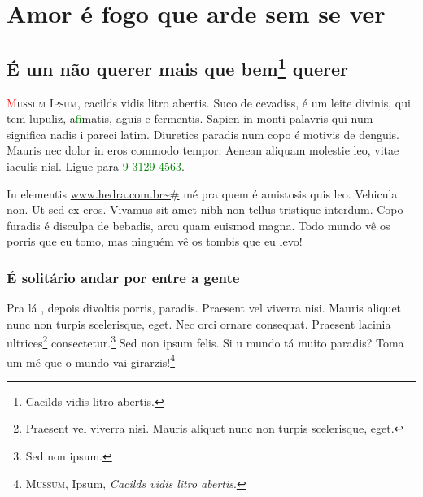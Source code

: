 
\part{Amor é fogo que arde sem se ver}

\begin{argumento}
  \lipsum[1]
\end{argumento}

\chapter{É um não querer mais que bem\footnote{Cacilds vidis litro abertis.} querer}


\begin{didascalia}
  \lipsum[2]
\end{didascalia}

\newcommand{\pacote}[1]{\marginnote{\tiny\alltt{#1}}}


\pacote{edlab-extra}
\begin{epigraphs} 
\end{epigraphs}

\pacote{lettrine.sty}
\lettrine[realheight]{\textcolor{red}{M}}{ussum Ipsum}, cacilds vidis litro abertis. Suco de cevadiss, é um leite
divinis, qui tem lupuliz, a\textcolor{green}{fi}matis, aguis e fermentis. Sapien in monti palavris
qui num significa nadis i pareci latim.  Diuretics paradis num copo é motivis
de denguis. Mauris nec dolor in eros commodo tempor. Aenean aliquam molestie
leo, vitae iaculis nisl. Ligue para \textcolor{green}{9-3129-4563}.


In elementis \url{www.hedra.com.br\~#} mé pra quem é amistosis quis leo. Vehicula non. Ut sed ex eros.
Vivamus sit amet nibh non tellus tristique interdum. Copo furadis é disculpa de
bebadis, arcu quam euismod magna. Todo mundo vê os porris que eu tomo, mas
ninguém vê os tombis que eu levo!

\section{É solitário andar por entre a gente}


Pra lá , depois divoltis porris, paradis. Praesent vel viverra nisi. Mauris
aliquet nunc non turpis scelerisque, eget. Nec orci ornare consequat. Praesent
lacinia ultrices\footnote{Praesent vel viverra nisi. Mauris
aliquet nunc non turpis scelerisque, eget.} consectetur.\footnote{Sed non ipsum.} Sed non ipsum felis. Si u mundo tá muito paradis?
Toma um mé que o mundo vai girarzis!\footnote{\textsc{Mussum}, Ipsum,
\textit{Cacilds vidis litro abertis}.}




